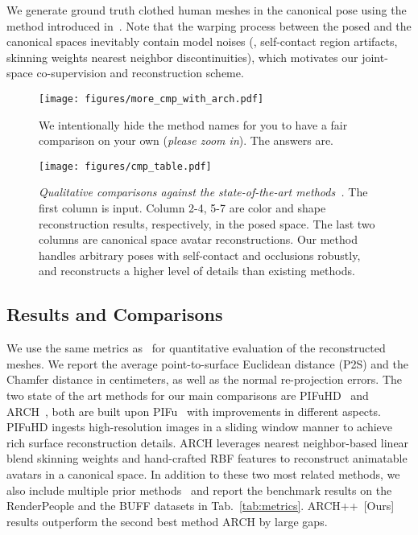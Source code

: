 \documentclass[10pt,twocolumn,letterpaper]{article}
\newcommand{\beforefigcaption}{\vspace{-5mm}}
\newcommand{\afterfigcaption}{\vspace{-5mm}}
\newcommand{\aftersection}{\vspace{-1.5mm}}
\newcommand{\beforesubsection}{\vspace{-1.5mm}}
\begin{document}
We generate ground truth clothed human meshes in the canonical pose using the method introduced in~\cite{huang2020arch}. Note that the warping process between the posed and the canonical spaces inevitably contain model noises (\eg, self-contact region artifacts, skinning weights nearest neighbor discontinuities), which motivates our joint-space co-supervision and reconstruction scheme.

\begin{figure}[ptb]
\centering
\texttt{[image: figures/more\_cmp\_with\_arch.pdf]}
\caption{We intentionally hide the method names for you to have a fair comparison on your own (\textit{please zoom in}). The answers are\protect\footnotemark.}
\label{fig:cmp_more_with_arch}
\vspace{-10pt}
\end{figure}

\begin{figure*}[ht]
\vspace{-2mm}
\centering
\texttt{[image: figures/cmp\_table.pdf]}
\beforefigcaption
\caption{\textit{Qualitative comparisons against the state-of-the-art methods~\cite{PIFuICCV19,saito2020pifuhd,huang2020arch}.}
The first column is input. Column 2-4, 5-7 are color and shape reconstruction results, respectively, in the posed space. The last two columns are canonical space avatar reconstructions.
Our method handles arbitrary poses with self-contact and occlusions robustly, and reconstructs a higher level of details than existing methods.
}
\afterfigcaption
\label{fig:result_table}
\end{figure*}

\beforesubsection
\subsection{Results and Comparisons} \label{sec:result}
\aftersection

We use the same metrics as~\cite{PIFuICCV19,saito2020pifuhd,huang2020arch} for quantitative evaluation of the reconstructed meshes. We report the average point-to-surface Euclidean distance (P2S) and the Chamfer distance in centimeters, as well as the  normal re-projection errors. The two state of the art methods for our main comparisons are PIFuHD~\cite{saito2020pifuhd} and ARCH~\cite{huang2020arch}, both are built upon PIFu~\cite{PIFuICCV19} with improvements in different aspects. PIFuHD ingests high-resolution images in a sliding window manner to achieve rich surface reconstruction details. ARCH leverages nearest neighbor-based linear blend skinning weights and hand-crafted RBF features to reconstruct animatable avatars in a canonical space. In addition to these two most related methods, we also include multiple prior methods~\cite{varol18_bodynet,VolumeRegECCVW2018,SiCloPeCVPR19,chen2019implicit_decoder,PIFuICCV19} and report the benchmark results on the RenderPeople and the BUFF datasets in Tab.~\ref{tab:metrics}. ARCH++~[Ours] results outperform the second best method ARCH by large gaps.
\end{document}
